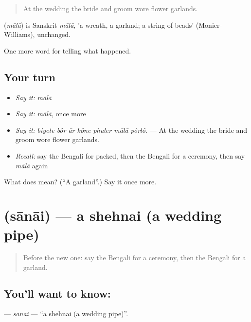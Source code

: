 \begin{quote}
At the wedding the bride and groom wore flower garlands.
\end{quote}

\begin{cousinweb}
\textbf{} (\emph{mālā}) is Sanskrit \emph{mālā}, 'a wreath, a garland; a string of beads' (Monier-Williams), unchanged.
\end{cousinweb}

\begin{grammarlens}[title={What you've built}]
One more word for telling what happened.
\end{grammarlens}

\subsection*{Your turn}
\begin{itemize}
\raggedright
  \item \emph{Say it:} \emph{mālā}
  \item \emph{Say it:} \emph{mālā}, once more
  \item \emph{Say it:} \emph{biyete bôr ār kône phuler mālā pôrlô.} — At the wedding the bride and groom wore flower garlands.
  \item \emph{Recall:} say the Bengali for packed, then the Bengali for a ceremony, then say \emph{mālā} again
\end{itemize}

\begin{tcolorbox}[breakable,colback=teal!4,colframe=teal!35!black,title={Before you move on}]
What does  mean? (\textquotedblleft{}A garland\textquotedblright{}.) Say it once more.
\end{tcolorbox}
\section[\texorpdfstring{\bn{সানাই} (sānāi)}{সানাই (sānāi)}]{ (sānāi) — a shehnai (a wedding pipe)}

\label{lesson:BN-C312-sanai}



\begin{quote}
Before the new one: say the Bengali for a ceremony, then the Bengali for a garland.
\end{quote}

\subsection*{You'll want to know: }
\textbf{} — \emph{sānāi} — \textquotedblleft{}a shehnai (a wedding pipe)\textquotedblright{}.

